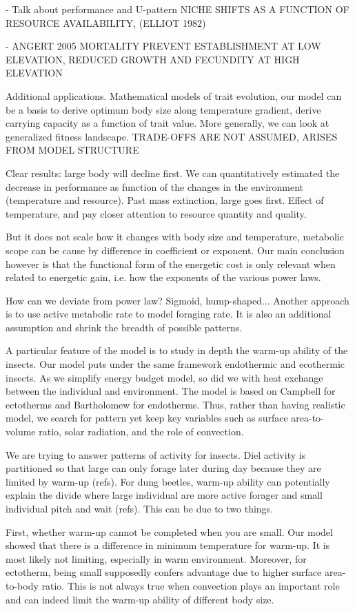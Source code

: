  - Talk about performance and U-pattern
 NICHE SHIFTS AS A FUNCTION OF RESOURCE AVAILABILITY, (ELLIOT 1982)
  
 - 
ANGERT 2005 MORTALITY PREVENT ESTABLISHMENT AT LOW ELEVATION, REDUCED GROWTH AND FECUNDITY AT HIGH ELEVATION

Additional applications.
Mathematical models of trait evolution, our model can be a basis to derive optimum body size along temperature gradient, derive carrying capacity as a function of trait value. 
More generally, we can look at generalized fitness landscape.
TRADE-OFFS ARE NOT ASSUMED, ARISES FROM MODEL STRUCTURE

Clear results: large body will decline first. 
We can quantitatively estimated the decrease in performance as function of the changes in the environment  (temperature and resource).
Past mass extinction, large goes first.
Effect of temperature, and pay closer attention to resource quantity and quality.

But it does not scale how it changes with body size and temperature, metabolic scope can be cause by difference in coefficient or exponent.
Our main conclusion however is that the functional form of the energetic cost is only relevant when related to energetic gain, i.e. how the exponents of the various power laws.  

How can we deviate from power law? 
Sigmoid, hump-shaped...
Another approach is to use active metabolic rate to model foraging rate.
It is also an additional assumption and shrink the breadth of possible patterns.

A particular feature of the model is to study in depth the warm-up ability of the insects.
Our model puts under the same framework endothermic and ecothermic insects.
As we simplify energy budget model, so did we with heat exchange between the individual and environment.
The model is based on Campbell for ectotherms and Bartholomew for endotherms.
Thus, rather than having realistic model, we search for pattern yet keep key variables such as surface area-to-volume ratio, solar radiation, and the role of convection.

We are trying to answer patterns of activity for insects.
Diel activity is partitioned so that large can only forage later during day because they are limited by warm-up (refs).
For dung beetles, warm-up ability can potentially explain the divide where large individual are more active forager and small individual pitch and wait (refs).
This can be due to two things.

First, whether warm-up cannot be completed when you are small.
Our model showed that there is a difference in minimum temperature for warm-up. 
It is most likely not limiting, especially in warm environment.
Moreover, for ectotherm, being small supposedly confers advantage due to higher surface area-to-body ratio. 
This is not always true when convection plays an important role and can indeed limit the warm-up ability of different body size.

